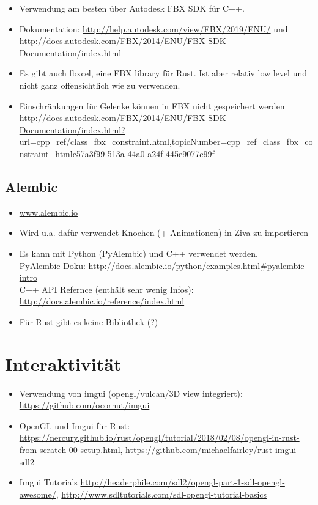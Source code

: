 \begin{itemize}
 \item Verwendung am besten über Autodesk FBX SDK für C++. 
 \item Dokumentation: \url{http://help.autodesk.com/view/FBX/2019/ENU/} und \url{http://docs.autodesk.com/FBX/2014/ENU/FBX-SDK-Documentation/index.html}
 \item Es gibt auch fbxcel, eine FBX library für Rust. Ist aber relativ low level und nicht ganz offensichtlich wie zu verwenden.
 \item Einschränkungen für Gelenke können in FBX nicht gespeichert werden \url{http://docs.autodesk.com/FBX/2014/ENU/FBX-SDK-Documentation/index.html?url=cpp_ref/class_fbx_constraint.html,topicNumber=cpp_ref_class_fbx_constraint_htmlc57a3f99-513a-44a0-a24f-445e9077c99f}
\end{itemize}

\subsection{Alembic}

\begin{itemize}
 \item \url{www.alembic.io}
 \item Wird u.a. dafür verwendet Knochen (+ Animationen) in Ziva zu importieren
 \item Es kann mit Python (PyAlembic) und C++ verwendet werden.\\
 PyAlembic Doku: \url{http://docs.alembic.io/python/examples.html#pyalembic-intro}\\
 C++ API Refernce (enthält sehr wenig Infos): \url{http://docs.alembic.io/reference/index.html}
 \item Für Rust gibt es keine Bibliothek (?)
\end{itemize}

\section{Interaktivität}

\begin{itemize}
 \item Verwendung von imgui (opengl/vulcan/3D view integriert): \url{https://github.com/ocornut/imgui}  %
 \item OpenGL und Imgui für Rust: \url{https://nercury.github.io/rust/opengl/tutorial/2018/02/08/opengl-in-rust-from-scratch-00-setup.html}, \url{https://github.com/michaelfairley/rust-imgui-sdl2}  %
 \item Imgui Tutorials \url{http://headerphile.com/sdl2/opengl-part-1-sdl-opengl-awesome/}, \url{http://www.sdltutorials.com/sdl-opengl-tutorial-basics}  %
\end{itemize}

